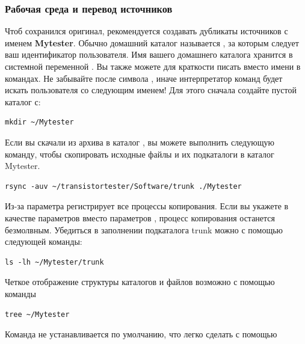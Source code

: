\subsubsection{Рабочая среда и перевод источников}
\label{sec:Arbeitsumgebung}
Чтоб сохранился оригинал, рекомендуется создавать дубликаты источников с именем \textbf{Mytester}.
Обычно домашний каталог называется , за которым следует ваш идентификатор пользователя.
Имя вашего домашнего каталога хранится в системной переменной .
Вы также можете для краткости писать \lname{\textasciitilde/} вместо имени в командах.
Не забывайте \lname {/} после символа \lname{\textasciitilde},
иначе интерпретатор команд будет искать пользователя со следующим именем!
Для этого сначала создайте пустой каталог с:
\begin{large} \vspace{-0.4em} \begin{verbatim}
mkdir ~/Mytester
\end{verbatim} \end{large}
Если вы скачали из архива в каталог ,
вы можете выполнить следующую команду, чтобы скопировать исходные файлы и их подкаталоги в каталог Mytester. 
\begin{large} \vspace{-0.4em} \begin{verbatim}
rsync -auv ~/transistortester/Software/trunk ./Mytester
\end{verbatim} \end{large}
Из-за параметра   регистрирует все процессы копирования.
Если вы укажете  в качестве параметров вместо параметров , процесс копирования останется безмолвным.
Убедиться в заполнении подкаталога trunk можно с помощью следующей команды:
\begin{large} \vspace{-0.4em} \begin{verbatim}
ls -lh ~/Mytester/trunk
\end{verbatim} \end{large}
Четкое отображение структуры каталогов и файлов возможно с помощью команды
\begin{large} \vspace{-0.4em} \begin{verbatim}
tree ~/Mytester
\end{verbatim} \end{large}
Команда не устанавливается по умолчанию, что легко сделать с помощью
